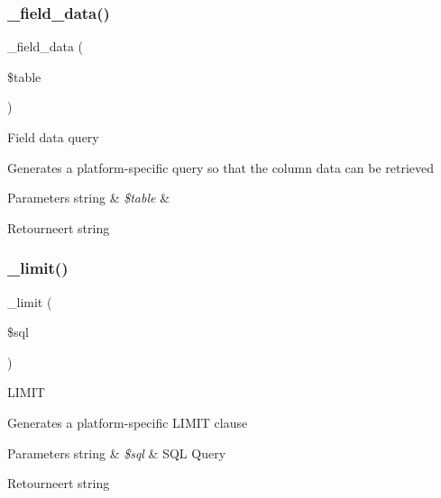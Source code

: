 \subsubsection{\texorpdfstring{\_field\_data()}{\_field\_data()}}
{\footnotesize\ttfamily \+\_\+field\+\_\+data (\begin{DoxyParamCaption}\item[{}]{\$table }\end{DoxyParamCaption})\hspace{0.3cm}{\ttfamily [protected]}}

Field data query

Generates a platform-\/specific query so that the column data can be retrieved


\begin{DoxyParams}[1]{Parameters}
string & {\em \$table} & \\
\hline
\end{DoxyParams}
\begin{DoxyReturn}{Retourneert}
string 
\end{DoxyReturn}
\mbox{\label{class_c_i___d_b__pdo__4d__driver_a3a02ea06541b8ecc25a33a61651562c8}} 
\subsubsection{\texorpdfstring{\_limit()}{\_limit()}}
{\footnotesize\ttfamily \+\_\+limit (\begin{DoxyParamCaption}\item[{}]{\$sql }\end{DoxyParamCaption})\hspace{0.3cm}{\ttfamily [protected]}}

L\+I\+M\+IT

Generates a platform-\/specific L\+I\+M\+IT clause


\begin{DoxyParams}[1]{Parameters}
string & {\em \$sql} & S\+QL Query \\
\hline
\end{DoxyParams}
\begin{DoxyReturn}{Retourneert}
string 
\end{DoxyReturn}
\mbox{\label{class_c_i___d_b__pdo__4d__driver_a7ccb7f9c301fe7f0a9db701254142b63}} 
